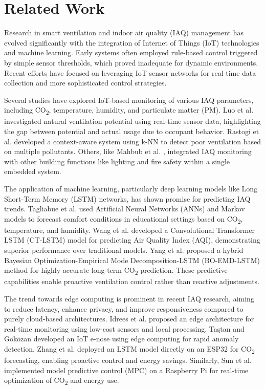 \section{Related Work}
\label{sec:related_work}

Research in smart ventilation and indoor air quality (IAQ) management has evolved significantly with the integration of Internet of Things (IoT) technologies and machine learning. Early systems often employed rule-based control triggered by simple sensor thresholds, which proved inadequate for dynamic environments. Recent efforts have focused on leveraging IoT sensor networks for real-time data collection and more sophisticated control strategies.

Several studies have explored IoT-based monitoring of various IAQ parameters, including CO\textsubscript{2}, temperature, humidity, and particulate matter (PM). Luo et al. \cite{Luo2021} investigated natural ventilation potential using real-time sensor data, highlighting the gap between potential and actual usage due to occupant behavior. Rastogi et al. \cite{Rastogi2021} developed a context-aware system using k-NN to detect poor ventilation based on multiple pollutants. Others, like Mahbub et al. \cite{Mahbub2021}, integrated IAQ monitoring with other building functions like lighting and fire safety within a single embedded system.

The application of machine learning, particularly deep learning models like Long Short-Term Memory (LSTM) networks, has shown promise for predicting IAQ trends. Tagliabue et al. \cite{Tagliabue2021} used Artificial Neural Networks (ANNs) and Markov models to forecast comfort conditions in educational settings based on CO\textsubscript{2}, temperature, and humidity. Wang et al. \cite{Wang2021} developed a Convolutional Transformer LSTM (CT-LSTM) model for predicting Air Quality Index (AQI), demonstrating superior performance over traditional models. Yang et al. \cite{Yang2021} proposed a hybrid Bayesian Optimization-Empirical Mode Decomposition-LSTM (BO-EMD-LSTM) method for highly accurate long-term CO\textsubscript{2} prediction. These predictive capabilities enable proactive ventilation control rather than reactive adjustments.

The trend towards edge computing is prominent in recent IAQ research, aiming to reduce latency, enhance privacy, and improve responsiveness compared to purely cloud-based architectures. Idrees et al. \cite{Idrees2021} proposed an edge architecture for real-time monitoring using low-cost sensors and local processing. Taştan and Göközan \cite{Tastan2019} developed an IoT e-nose using edge computing for rapid anomaly detection. Zhang et al. \cite{Zhang2021} deployed an LSTM model directly on an ESP32 for CO\textsubscript{2} forecasting, enabling proactive control and energy savings. Similarly, Sun et al. \cite{Sun2022} implemented model predictive control (MPC) on a Raspberry Pi for real-time optimization of CO\textsubscript{2} and energy use.

